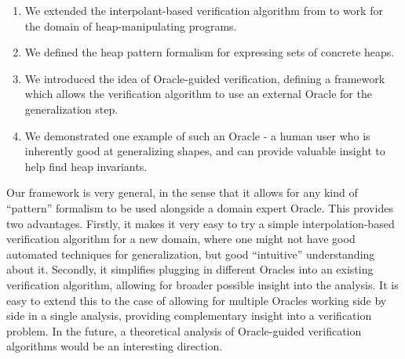 \begin{enumerate}
  \item We extended the interpolant-based verification algorithm from \cite{mcmillan06} to work for the domain of heap-manipulating programs.
  \item We defined the heap pattern formalism for expressing sets of concrete heaps.
  \item We introduced the idea of Oracle-guided verification, defining a framework which allows the verification algorithm to use an external Oracle for the generalization step.
  \item We demonstrated one example of such an Oracle - a human user who is inherently good at generalizing shapes, and can provide valuable insight to help find heap invariants.
\end{enumerate}

Our framework is very general, in the sense that it allows for any kind of ``pattern'' formalism to be used alongside a domain expert Oracle. This provides two advantages. Firstly, it makes it very easy to try a simple interpolation-based verification algorithm for a new domain, where one might not have good automated techniques for generalization, but good ``intuitive'' understanding about it. Secondly, it simplifies plugging in different Oracles into an existing verification algorithm, allowing for broader possible insight into the analysis. It is easy to extend this to the case of allowing for multiple Oracles working side by side in a single analysis, providing complementary insight into a verification problem. In the future, a theoretical analysis of Oracle-guided verification algorithms would be an interesting direction.
